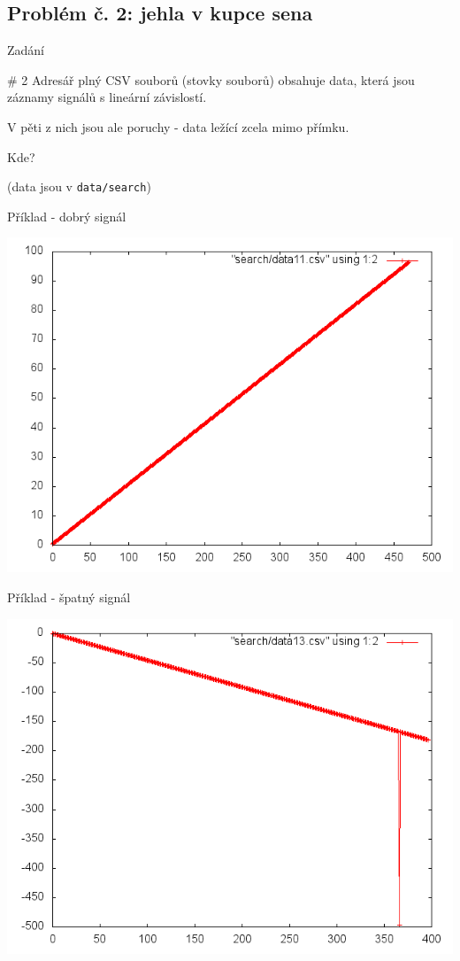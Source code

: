 \documentclass{beamer}
\begin{document}
\subsection{Problém č. 2: jehla v kupce sena}

\begin{frame}{Zadání}
  \begin{block}{\# 2}
    Adresář plný CSV souborů (stovky souborů) obsahuje data, která jsou záznamy signálů s lineární závislostí.

    V pěti z nich jsou ale poruchy - data ležící zcela mimo přímku.

    Kde?

    (data jsou v \texttt{data/search})
  \end{block}
\end{frame}

\begin{frame}{Příklad - dobrý signál}
  \begin{center}
      \includegraphics[width=0.6\columnwidth]{search_good}
      \end{center}
\end{frame}
\begin{frame}{Příklad - špatný signál}
  \begin{center}
      \includegraphics[width=0.6\columnwidth]{search_bad}
      \end{center}
\end{frame}
\end{document}
